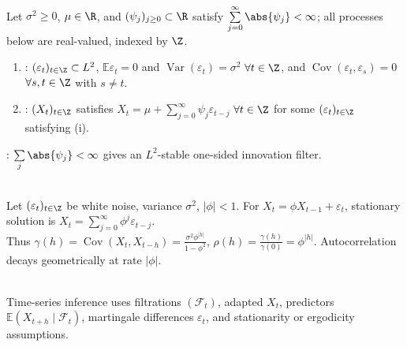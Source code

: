 \begin{definition} \label{def:white-noise-linear-process} \\
Let $\sigma^2\geq0$, $\mu\in\R$, and $(\psi_j)_{j\geq0}\subset\R$ satisfy $\sum\limits_{j=0}^{\infty}\abs{\psi_j}<\infty$; all processes below are real-valued, indexed by $\Z$.
\begin{enumerate}[label=(\roman*)]
\setlength{\itemsep}{0pt}
\item {}: $(\varepsilon_t)_{t\in\Z}\subset L^2$, $\mathbb{E}\varepsilon_t=0$ and $\operatorname{Var}(\varepsilon_t)=\sigma^2$ $\forall t\in\Z$, and $\operatorname{Cov}(\varepsilon_t,\varepsilon_s)=0$ $\forall s,t\in\Z$ with $s\neq t$.
\item {}: $(X_t)_{t\in\Z}$ satisfies $X_t=\mu+\sum\limits_{j=0}^{\infty}\psi_j\varepsilon_{t-j}$ $\forall t\in\Z$ for some $(\varepsilon_t)_{t\in\Z}$ satisfying (i).
\end{enumerate}
: $\sum\limits_j\abs{\psi_j}<\infty$ gives an $L^2$-stable one-sided innovation filter.
\end{definition}

\begin{example} \label{ex:ar-one-stationarity} \\
Let $(\varepsilon_t)_{t\in\Z}$ be white noise, variance $\sigma^2$, $|\phi|<1$. For $X_t=\phi X_{t-1}+\varepsilon_t$, stationary solution is $X_t=\sum\limits_{j=0}^{\infty}\phi^j\varepsilon_{t-j}$.\\
Thus $\gamma(h)=\operatorname{Cov}(X_t,X_{t-h})=\frac{\sigma^2\phi^{|h|}}{1-\phi^2}$, $\rho(h)=\frac{\gamma(h)}{\gamma(0)}=\phi^{|h|}$. Autocorrelation decays geometrically at rate $|\phi|$.
\end{example}

\begin{remark} \label{rem:time-series-prerequisite-stochastic-processes} \\
Time-series inference uses filtrations $(\mathcal{F}_t)$, adapted $X_t$, predictors $\mathbb{E}(X_{t+h}\mid\mathcal{F}_t)$, martingale differences $\varepsilon_t$, and stationarity or ergodicity assumptions.
\end{remark}
